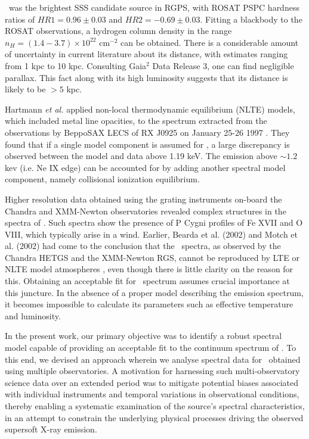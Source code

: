 	\source\ was the brightest SSS candidate source in RGPS, with ROSAT PSPC hardness ratios of $HR1=0.96\pm 0.03$ and $HR2=-0.69\pm 0.03$. Fitting a blackbody to the ROSAT observations, a hydrogen column density in the range $n_H=(1.4-3.7)\times 10^{22}$ cm$^{-2}$ can be obtained. There is a considerable amount of uncertainty in current literature about its distance, with estimates ranging from 1 kpc to 10 kpc. Consulting Gaia$^2$ Data Release 3, one can find negligible parallax. This fact along with its high luminosity suggests that its distance is likely to be $>5$ kpc.
	
	Hartmann \textit{et al.} applied non-local thermodynamic equilibrium (NLTE) models, which included metal line opacities, to the spectrum extracted from the observations by BeppoSAX LECS of RX J0925 on January 25-26 1997 \cite{hartmann1999constraining}. They found that if a single model component is assumed for \source, a large discrepancy is observed between the model and data above 1.19 keV. The emission above $\sim 1.2$ kev (i.e. Ne IX edge) can be accounted for by adding another spectral model component, namely collisional ionization equilibrium.
	
	Higher resolution data obtained using the grating instruments on-board the Chandra and XMM-Newton observatories revealed complex structures in the spectra of \source. Such spectra show the presence of P Cygni profiles of Fe XVII and O VIII, which typically arise in a wind. Earlier, Bearda et al. (2002) and Motch et al. (2002) had come to the conclusion that the \source\ spectra, as observed by the Chandra HETGS and the XMM-Newton RGS, cannot be reproduced by LTE or NLTE model atmospheres \cite{beardaChandra2002AA,motchXmmNewton2002AA}, even though there is little clarity on the reason for this. Obtaining an acceptable fit for \source\ spectrum assumes crucial importance at this juncture. In the absence of a proper model describing the emission spectrum, it becomes impossible to calculate its parameters such as effective temperature and luminosity.
	
	In the present work, our primary objective was to identify a robust spectral model capable of providing an acceptable fit to the continuum spectrum of \source. To this end, we devised an approach wherein we analyse spectral data for \source\ obtained using multiple observatories. A motivation for harnessing such multi-observatory science data over an extended period was to mitigate potential biases associated with individual instruments and temporal variations in observational conditions, thereby enabling a systematic examination of the source's spectral characteristics, in an attempt to constrain the underlying physical processes driving the observed supersoft X-ray emission.
	
